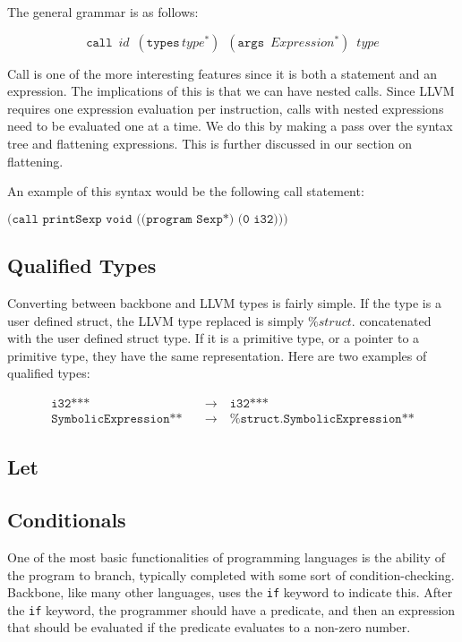 \documentclass[journal=jacsat, manuscript=article]{achemso}
\begin{document}
The general grammar is as follows:

$$\texttt{call}\,\,\,id\,\,\,(\texttt{types}\,type^*)\,\,\,(\texttt{args}\,\,\,Expression^*)\,\,\,type$$

Call is one of the more interesting features since it is both a statement and an expression.
The implications of this is that we can have nested calls. Since LLVM requires one expression evaluation
per instruction, calls with nested expressions need to be evaluated one at a time. We do this by
making a pass over the syntax tree and flattening expressions. This is further discussed in our section
on flattening.

An example of this syntax would be the following call statement:

$\texttt{(call printSexp void ((program Sexp*) (0 i32)))}$

\subsection{Qualified Types}

Converting between backbone and LLVM types is fairly simple. If the type is a user defined struct,
the LLVM type replaced is simply $\%struct.$ concatenated with the user defined struct type. If it
is a primitive type, or a pointer to a primitive type, they have the same representation. Here
are two examples of qualified types:

\begin{align}
\texttt{i32***}\quad &\rightarrow \quad \texttt{i32***} \\
\texttt{SymbolicExpression**}\quad &\rightarrow\quad \texttt{\%struct.SymbolicExpression**}
\end{align}

\subsection{Let}


\subsection{Conditionals}

One of the most basic functionalities of programming languages is the ability of the program to branch, typically completed with some sort of condition-checking. Backbone, like many other languages, uses the \texttt{if} keyword to indicate this. After the \texttt{if} keyword, the programmer should have a predicate, and then an expression that should be evaluated if the predicate evaluates to a non-zero number.
\end{document}
